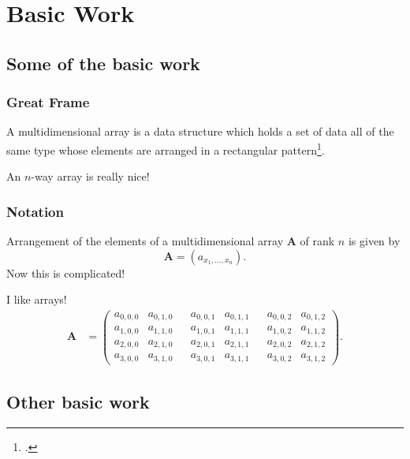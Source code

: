 \section{Basic Work}


\subsection{Some of the basic work}

\begin{frame}
\frametitle{Great Frame}
A multidimensional array is a data structure which holds a set of data all of the same type whose elements are arranged in a rectangular pattern\footcite{ISO:2010:Fortran}.
\begin{Definition}
\label{def:array}
An $n$-way array is really nice!
\end{Definition}
\end{frame}


\begin{frame}
\frametitle{Notation}
Arrangement of the elements of a multidimensional array $\mathbf{A}$ of rank $n$ is given by
\begin{equation}\label{equ:array}
\mathbf{A} = (a_{x_1,\dots,x_n}).
\end{equation}%
Now this is complicated!
\begin{example}[Arrangement]
\label{ex:array}
I like arrays!
\begin{align*}
\mathbf{A} &=
\begin{pmatrix}
a_{0,0,0} & a_{0,1,0} & & a_{0,0,1} & a_{0,1,1} & & a_{0,0,2} & a_{0,1,2} \\
a_{1,0,0} & a_{1,1,0} & & a_{1,0,1} & a_{1,1,1} & & a_{1,0,2} & a_{1,1,2} \\
a_{2,0,0} & a_{2,1,0} & & a_{2,0,1} & a_{2,1,1} & & a_{2,0,2} & a_{2,1,2} \\
a_{3,0,0} & a_{3,1,0} & & a_{3,0,1} & a_{3,1,1} & & a_{3,0,2} & a_{3,1,2}
\end{pmatrix}.
\end{align*}
\end{example}
\end{frame}


\subsection{Other basic work}


